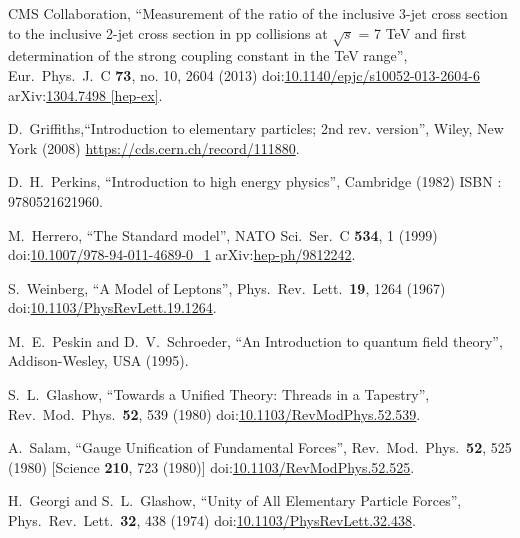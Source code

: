 \begin{thebibliography}{99}

CMS Collaboration, ``Measurement of the ratio of the inclusive 3-jet cross section to the inclusive 2-jet cross section in pp collisions at $\sqrt{s}$ = 7 TeV and first determination of the strong coupling constant in the TeV range'', Eur.\ Phys.\ J.\ C {\bf 73}, no. 10, 2604 (2013) doi:\href{http://dx.doi.org/10.1140/epjc/s10052-013-2604-6}{10.1140/epjc/s10052-013-2604-6} arXiv:\href{https://arxiv.org/abs/1304.7498}{1304.7498 [hep-ex]}.


D.~Griffiths,``Introduction to elementary particles; 2nd rev. version'', Wiley, New York (2008) \url{https://cds.cern.ch/record/111880}.

D.~H.~Perkins, ``Introduction to high energy physics'', Cambridge (1982) ISBN : 9780521621960. 

M.~Herrero, ``The Standard model'', NATO Sci.\ Ser.\ C {\bf 534}, 1 (1999) doi:\href{http://dx.doi.org/10.1007/978-94-011-4689-0\_1}{10.1007/978-94-011-4689-0\_1} arXiv:\href{https://arxiv.org/abs/hep-ph/9812242}{hep-ph/9812242}.

S.~Weinberg, ``A Model of Leptons'', Phys.\ Rev.\ Lett.\ {\bf 19}, 1264 (1967) doi:\href{http://dx.doi.org/10.1103/PhysRevLett.19.1264}{10.1103/PhysRevLett.19.1264}.

M.~E.~Peskin and D.~V.~Schroeder, ``An Introduction to quantum field theory'', Addison-Wesley, USA (1995).

S.~L.~Glashow, ``Towards a Unified Theory: Threads in a Tapestry'', Rev.\ Mod.\ Phys.\ {\bf 52}, 539 (1980) doi:\href{http://dx.doi.org/10.1103/RevModPhys.52.539}{10.1103/RevModPhys.52.539}.

A.~Salam, ``Gauge Unification of Fundamental Forces'', Rev.\ Mod.\ Phys.\ {\bf 52}, 525 (1980) [Science {\bf 210}, 723 (1980)] doi:\href{http://dx.doi.org/10.1103/RevModPhys.52.525}{10.1103/RevModPhys.52.525}.

H.~Georgi and S.~L.~Glashow, ``Unity of All Elementary Particle Forces'', Phys.\ Rev.\ Lett.\ {\bf 32}, 438 (1974) doi:\href{http://dx.doi.org/10.1103/PhysRevLett.32.438}{10.1103/PhysRevLett.32.438}.


\end{thebibliography}
